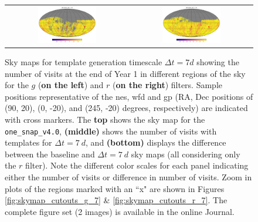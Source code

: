 \documentclass[preprintm,linenumbers]{aastex631}
\newcommand{\baseline}{\texttt{one\_snap\_v4.0}\xspace}
\begin{document}
\begin{figure}
\begin{tabular}{c c}
         \includegraphics[width=0.5\textwidth]{results/skymaps_cutout/skymaps_cutout_delta_first_year_one_snap_v4_0_10yrs_db_noDD_noTwi_tscale-7_nside-256_doAllTemplateMetrics_reduceCount_g_noDD_noTwi.pdf} &
         \includegraphics[width=0.5\textwidth]{results/skymaps_cutout/skymaps_cutout_delta_first_year_one_snap_v4_0_10yrs_db_noDD_noTwi_tscale-7_nside-256_doAllTemplateMetrics_reduceCount_r_noDD_noTwi.pdf} \\

   \end{tabular}

        \caption{Sky maps for template generation timescale $\Delta t = 7 \si{d}$ showing the number of visits at the end of Year 1 in different regions of the sky for the $g$ (\textbf{on the left}) and  $r$ (\textbf{on the right}) filters. 
        Sample positions representative of the \gls*{nes}, \gls*{wfd} and \gls*{gp} (RA, Dec positions of (90, 20), (0, -20), and (245, -20) degrees, respectively) are indicated with cross markers. 
        The \textbf{top} shows the sky map for the \baseline, \textbf{(middle)} shows the number of visits with templates for $\Delta t = 7\ \si{d}$, and \textbf{(bottom)} displays the difference between the baseline and $\Delta t = 7\ \si{d}$ sky maps (all considering only the $r$ filter). Note the different color scales for each panel indicating either the number of visits or difference in number of visits. 
        Zoom in plots of the regions marked with an ``x" are shown in Figures \ref{fig:skymap_cutouts_g_7} \& \ref{fig:skymap_cutouts_r_7}. 
        The complete figure set (2 images) is available in the online Journal. 
        }
        \label{fig:all_together_r_7d}
	\end{figure}
\end{document}
